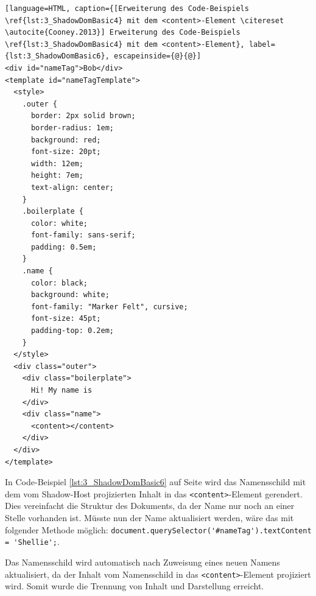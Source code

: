 \begin{enumerate}
\begin{lstlisting}[language=HTML, caption={[Erweiterung des Code-Beispiels \ref{lst:3_ShadowDomBasic4} mit dem <content>-Element \citereset \autocite{Cooney.2013}] Erweiterung des Code-Beispiels \ref{lst:3_ShadowDomBasic4} mit dem <content>-Element}, label={lst:3_ShadowDomBasic6}, escapeinside={@}{@}]
<div id="nameTag">Bob</div>
<template id="nameTagTemplate">
  <style>
    .outer {
      border: 2px solid brown;
      border-radius: 1em;
      background: red;
      font-size: 20pt;
      width: 12em;
      height: 7em;
      text-align: center;
    }
    .boilerplate {
      color: white;
      font-family: sans-serif;
      padding: 0.5em;
    }
    .name {
      color: black;
      background: white;
      font-family: "Marker Felt", cursive;
      font-size: 45pt;
      padding-top: 0.2em;
    }
  </style>
  <div class="outer">
    <div class="boilerplate">
      Hi! My name is
    </div>
    <div class="name">
      <content></content>
    </div>
  </div>
</template>
\end{lstlisting}

In Code-Beispiel \ref{lst:3_ShadowDomBasic6} auf Seite \pageref{lst:3_ShadowDomBasic6} wird das Namensschild mit dem vom Shadow-Host projizierten Inhalt in das \lstinline|<content>|-Element gerendert. Dies vereinfacht die Struktur des Dokuments, da der Name nur noch an einer Stelle vorhanden ist. Müsste nun der Name aktualisiert werden, wäre das mit folgender Methode möglich: \lstinline|document.querySelector('#nameTag').textContent = 'Shellie';|.

Das Namensschild wird automatisch nach Zuweisung eines neuen Namens aktualisiert, da der Inhalt vom Namensschild in das \lstinline|<content>|-Element projiziert wird. Somit wurde die Trennung von Inhalt und Darstellung erreicht.
\end{enumerate}